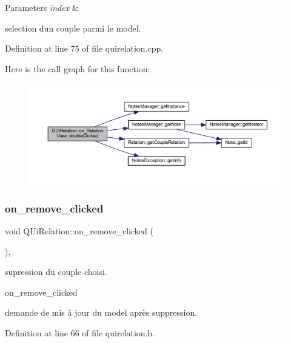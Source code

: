 \begin{DoxyParams}{Parameters}
{\em index} & \\
\hline
\end{DoxyParams}
selection d\textquotesingle{}un couple parmi le model. 

Definition at line 75 of file quirelation.\+cpp.

Here is the call graph for this function\+:\nopagebreak
\begin{figure}[H]
\begin{center}
\leavevmode
\includegraphics[width=350pt]{class_q_ui_relation_a28751a4ca2c2efb17c12bb45811a4b27_cgraph}
\end{center}
\end{figure}
\mbox{\label{class_q_ui_relation_a14fddadaa70fa8c82a0e49a547e2f6b5}} 
\subsubsection{\texorpdfstring{on\+\_\+remove\+\_\+clicked}{on\_remove\_clicked}}
{\footnotesize\ttfamily void Q\+Ui\+Relation\+::on\+\_\+remove\+\_\+clicked (\begin{DoxyParamCaption}{ }\end{DoxyParamCaption})\hspace{0.3cm}{\ttfamily [inline]}, {\ttfamily [slot]}}



supression du couple choisi. 

on\+\_\+remove\+\_\+clicked

demande de mis à jour du model après suppression. 

Definition at line 66 of file quirelation.\+h.

